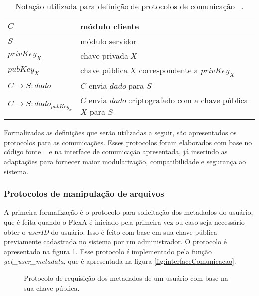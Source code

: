         \begin{table}[!ht]
        
        \centering
        \begin{tabular}{|l|l|}
        \hline
        
        $C$ & módulo cliente \\
        \hline
        $S$ & módulo servidor \\
        \hline
        $privKey_{X}$ & chave privada $X$ \\
        \hline
        $pubKey_{X}$ & chave pública $X$ correspondente a $privKey_{X}$\\
        \hline
        $C \rightarrow S : dado$ & $C$ envia $dado$ para $S$\\
        \hline
        $C \rightarrow S : {dado}_{pubKey_{x}}$ & $C$ envia $dado$ criptografado com a chave pública $X$ para $S$\\
        \hline

        \end{tabular}
        \caption{Notação utilizada para definição de protocolos de comunicação ~\cite{ross}.}
        \label{tab:notacao}
        \end{table}
        
        Formalizadas as definições que serão utilizadas a seguir, são apresentados os protocolos para as comunicações. Esses protocolos foram elaborados com base no código fonte ~\cite{mario} e na interface de comunicação apresentada, já inserindo as adaptações para fornecer maior modularização, compatibilidade e segurança ao sistema.
        
        \subsubsection{Protocolos de manipulação de arquivos}
        
        A primeira formalização é o protocolo para solicitação dos metadados do usuário, que é feita quando o FlexA é iniciado pela primeira vez ou caso seja necessário obter o \textit{userID} do usuário. Isso é feito com base em sua chave pública previamente cadastrada no sistema por um administrador. O protocolo é apresentado na figura \ref{fig:protMetadadosUsuario}. Esse protocolo é implementado pela função \textit{get\_user\_metadata}, que é apresentada na figura \ref{fig:interfaceComunicacao}.
        
        \begin{figure}[!ht]
        
        
        \caption{Protocolo de requisição dos metadados de um usuário com base na sua chave pública.}
        \label{fig:protMetadadosUsuario}
        \end{figure}
        
